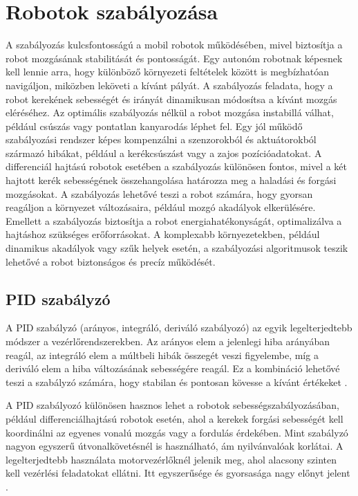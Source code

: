 \section{Robotok szabályozása}
A szabályozás kulcsfontosságú a mobil robotok működésében, mivel biztosítja a robot mozgásának stabilitását és pontosságát. Egy autonóm robotnak képesnek kell lennie arra, hogy különböző környezeti feltételek között is megbízhatóan navigáljon, miközben leköveti a kívánt pályát. A szabályozás feladata, hogy a robot kerekének sebességét és irányát dinamikusan módosítsa a kívánt mozgás eléréséhez. Az optimális szabályozás nélkül a robot mozgása instabillá válhat, például csúszás vagy pontatlan kanyarodás léphet fel. Egy jól működő szabályozási rendszer képes kompenzálni a szenzorokból és aktuátorokból származó hibákat, például a kerékcsúszást vagy a zajos pozícióadatokat. A differenciál hajtású robotok esetében a szabályozás különösen fontos, mivel a két hajtott kerék sebességének összehangolása határozza meg a haladási és forgási mozgásokat. A szabályozás lehetővé teszi a robot számára, hogy gyorsan reagáljon a környezet változásaira, például mozgó akadályok elkerülésére. Emellett a szabályozás biztosítja a robot energiahatékonyságát, optimalizálva a hajtáshoz szükséges erőforrásokat. A komplexabb környezetekben, például dinamikus akadályok vagy szűk helyek esetén, a szabályozási algoritmusok teszik lehetővé a robot biztonságos és precíz működését.

\subsection{PID szabályzó}
A PID szabályzó (arányos, integráló, deriváló szabályozó) az egyik legelterjedtebb módszer a vezérlőrendszerekben. Az arányos elem a jelenlegi hiba arányában reagál, az integráló elem a múltbeli hibák összegét veszi figyelembe, míg a deriváló elem a hiba változásának sebességére reagál. Ez a kombináció lehetővé teszi a szabályzó számára, hogy stabilan és pontosan kövesse a kívánt értékeket \cite{astrom_feedback}.

A PID szabályozó különösen hasznos lehet a robotok sebességszabályozásában, például differenciálhajtású robotok esetén, ahol a kerekek forgási sebességét kell koordinálni az egyenes vonalú mozgás vagy a fordulás érdekében. Mint szabályzó nagyon egyszerű útvonalkövetésnél is használható, ám nyilvánvalóak korlátai. A legelterjedtebb használata motorvezérlőknél jelenik meg, ahol alacsony szinten kell vezérlési feladatokat ellátni. Itt egyszerűsége és gyorsasága nagy előnyt jelent \cite{siciliano_springer_handbook}.

